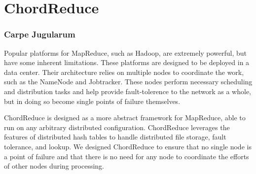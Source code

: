 \documentclass[10pt, conference, compsocconf]{IEEEtran}
\begin{document}






\section{ChordReduce}

\subsubsection*{Carpe Jugularum}
Popular platforms for MapReduce, such as Hadoop, are extremely powerful, but have some inherent limitations.  
These platforms are designed to be deployed in a data center.  
Their architecture relies on multiple nodes to coordinate the work, such as the NameNode and Jobtracker.
These nodes perform necessary scheduling and distribution tasks and help provide fault-tolerence to the network as a whole, but in doing so become single points of failure themselves.

ChordReduce is designed as a more abstract framework for MapReduce, able to run on any arbitrary distributed configuration.
ChordReduce leverages the features of distributed hash tables to handle distributed file storage, fault tolerance, and lookup.  We designed ChordReduce to ensure that no single node is a point of failure and that there is no need for any node to coordinate the efforts of other nodes during processing.
\end{document}
